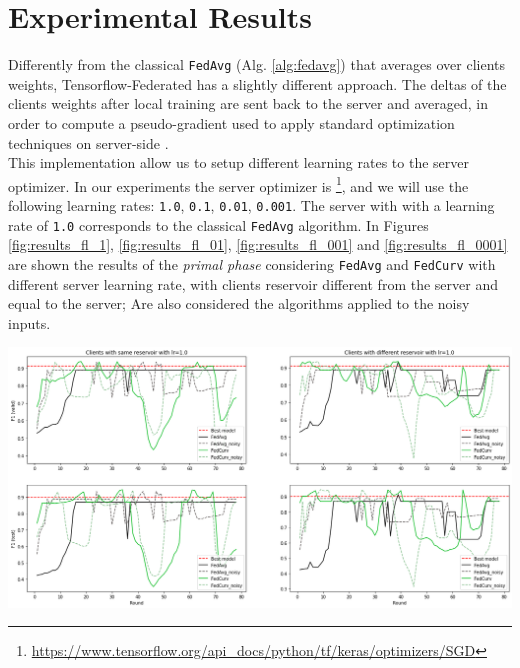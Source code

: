 {{{\section{Experimental Results}\label{sec:results}

Differently from the classical \texttt{FedAvg} (Alg. \ref{alg:fedavg}) that averages over clients weights, Tensorflow-Federated has a slightly different approach. The deltas of the clients weights after local training are sent back to the server and averaged, in order to compute a pseudo-gradient used to apply standard optimization techniques on server-side \cite{reddi2020adaptive}. \\

This implementation allow us to setup different learning rates to the server optimizer. In our experiments the server optimizer is \footnote{\url{https://www.tensorflow.org/api_docs/python/tf/keras/optimizers/SGD}}, and we will use the following learning rates: \texttt{1.0}, \texttt{0.1}, \texttt{0.01}, \texttt{0.001}. The server with  with a learning rate of \texttt{1.0} corresponds to the classical \texttt{FedAvg} algorithm. In Figures \ref{fig:results_fl_1}, \ref{fig:results_fl_01}, \ref{fig:results_fl_001} and \ref{fig:results_fl_0001} are shown the results of the \textit{primal phase} considering \texttt{FedAvg} and \texttt{FedCurv} with different server learning rate, with clients reservoir different from the server and equal to the server; Are also considered the algorithms applied to the noisy inputs.


\begin{center}
\begin{minipage}[c]{\textwidth}
    \centering
    \includegraphics[width=1.0\textwidth]{contents/Chapter6/results_fl_1.png}
    \label{fig:results_fl_1}
\end{minipage}
\end{center}

}}}
